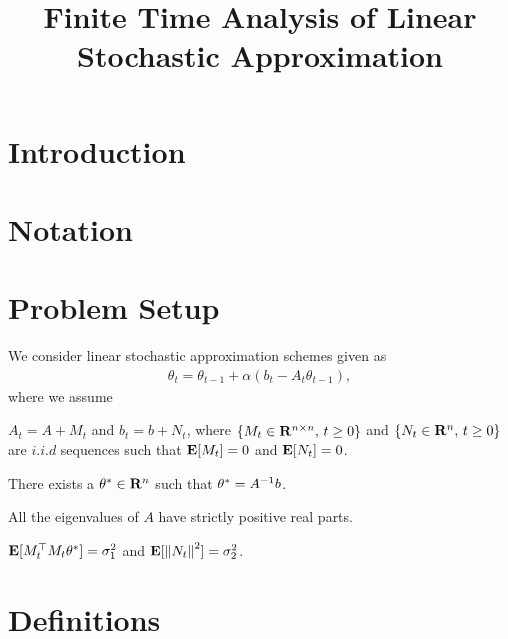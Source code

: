 \documentclass{article}
\title{Finite Time Analysis of Linear Stochastic Approximation}
\author{
}
\begin{document}

\maketitle
\begin{abstract}

\end{abstract}

\section{Introduction}
\section{Notation}

\section{Problem Setup}
We consider linear stochastic approximation schemes given as
\begin{align}
\theta_t=\theta_{t-1}+\alpha(b_t-A_t\theta_{t-1}),
\end{align}
where we assume
\begin{assumption}
\item $A_t=A+M_t$ and $b_t=b+N_t$, where $\{M_t \in \mathbf{R}^{n\times n},\,t\geq 0\}$ and $\{N_t\in\mathbf{R}^n,\,t\geq 0\}$ are $i.i.d$ sequences such that $\mathbf{E}[M_t]=0$ and $\mathbf{E}[N_t]=0$.
\item There exists a $\theta^*\in \mathbf{R}^n$ such that $\theta^*=A^{-1}b$.
\item All the eigenvalues of $A$ have strictly positive real parts.
\item $\mathbf{E}[M_t^\top M_t\theta^*]=\sigma_1^2$ and $\mathbf{E}[\left\| N_t\right\|^2]=\sigma_2^2$.
\end{assumption}

\begin{example}
\end{example}

\begin{example}[TD(0)]
\end{example}


\section{Definitions}
\begin{definition}
\end{definition}
\end{document}
